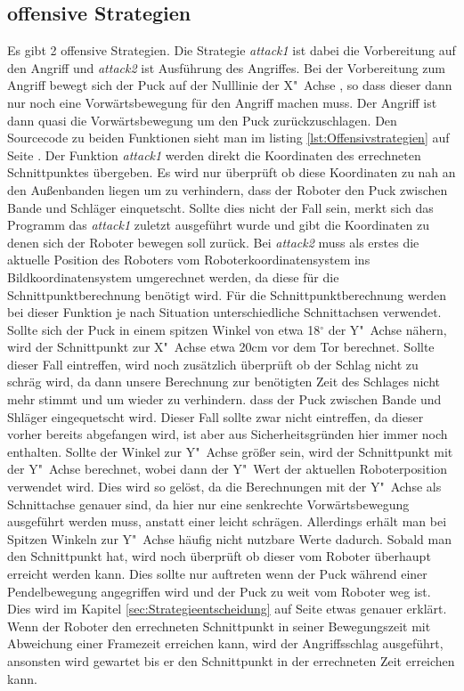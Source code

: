 \subsection{offensive Strategien}
Es gibt 2 offensive Strategien. Die Strategie \textit{attack1} ist dabei die Vorbereitung auf den Angriff und \textit{attack2} ist Ausführung des Angriffes. Bei der Vorbereitung zum Angriff bewegt sich der Puck auf der Nulllinie der X"~Achse , so dass dieser dann nur noch eine Vorwärtsbewegung für den Angriff machen muss. Der Angriff ist dann quasi die Vorwärtsbewegung um den Puck zurückzuschlagen.
Den Sourcecode zu beiden Funktionen sieht man im listing \ref{lst:Offensivstrategien} auf Seite \pageref{lst:Offensivstrategien}.
Der Funktion \textit{attack1} werden direkt die Koordinaten des errechneten Schnittpunktes übergeben. Es wird nur überprüft ob diese Koordinaten zu nah an den Außenbanden liegen um zu verhindern, dass der Roboter den Puck zwischen Bande und Schläger einquetscht. Sollte dies nicht der Fall sein, merkt sich das Programm das \textit{attack1} zuletzt ausgeführt wurde und gibt die Koordinaten zu denen sich der Roboter bewegen soll zurück.
Bei \textit{attack2} muss als erstes die aktuelle Position des Roboters vom Roboterkoordinatensystem ins Bildkoordinatensystem umgerechnet werden, da diese für die Schnittpunktberechnung benötigt wird. Für die Schnittpunktberechnung werden bei dieser Funktion je nach Situation unterschiedliche Schnittachsen verwendet. Sollte sich der Puck in einem spitzen Winkel von etwa 18$^\circ$ der Y"~Achse nähern, wird der Schnittpunkt zur X"~Achse etwa 20cm vor dem Tor berechnet. Sollte dieser Fall eintreffen, wird noch zusätzlich überprüft ob der Schlag nicht zu schräg wird, da dann unsere Berechnung zur benötigten Zeit des Schlages nicht mehr stimmt und um wieder zu verhindern. dass der Puck zwischen Bande und Shläger eingequetscht wird. Dieser Fall sollte zwar nicht eintreffen, da dieser vorher bereits abgefangen wird, ist aber aus Sicherheitsgründen hier immer noch enthalten. Sollte der Winkel zur Y"~Achse größer sein, wird der Schnittpunkt mit der Y"~Achse berechnet, wobei dann der Y"~Wert der aktuellen Roboterposition verwendet wird. Dies wird so gelöst, da die Berechnungen mit der Y"~Achse als Schnittachse genauer sind, da hier nur eine senkrechte Vorwärtsbewegung ausgeführt werden muss, anstatt einer leicht schrägen. Allerdings erhält man bei Spitzen Winkeln zur Y"~Achse häufig nicht nutzbare Werte dadurch. Sobald man den Schnittpunkt hat, wird noch überprüft ob dieser vom Roboter überhaupt erreicht werden kann. Dies sollte nur auftreten wenn der Puck während einer Pendelbewegung angegriffen wird und der Puck zu weit vom Roboter weg ist. Dies wird im Kapitel \ref{sec:Strategieentscheidung} auf Seite \pageref{sec:Strategieentscheidung} etwas genauer erklärt. Wenn der Roboter den errechneten Schnittpunkt in seiner Bewegungszeit mit Abweichung einer Framezeit erreichen kann, wird der Angriffsschlag ausgeführt, ansonsten wird gewartet bis er den Schnittpunkt in der errechneten Zeit erreichen kann.
